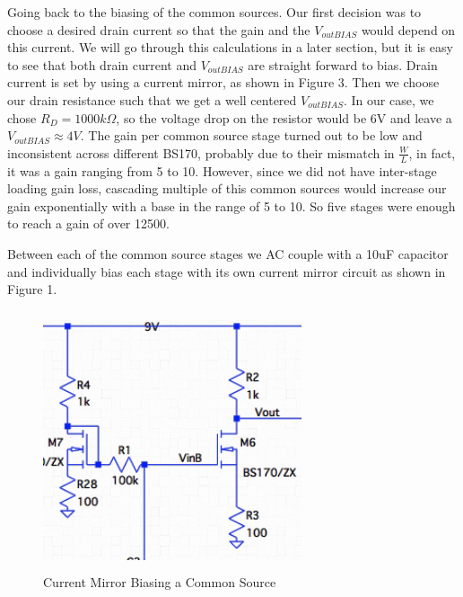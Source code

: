 \documentclass[11pt, twoside, letterpaper]{article}
\begin{document}
Going back to the biasing of the common sources. Our first decision was to choose a desired drain current so that the gain and the $V_{outBIAS}$
would depend on this current. We will go through this calculations in a later section, but it is easy to see that both drain current and 
$V_{outBIAS}$ are straight forward to bias. Drain current is set by using a current mirror, as shown in Figure 3. Then we choose our drain 
resistance such that we get a well centered $V_{outBIAS}$. In our case, we chose $R_D=1000k\Omega$, so the voltage drop on the resistor would be 
6V and leave a $V_{outBIAS}\approx 4V$. The gain per common source stage turned out to be low and inconsistent across different BS170, probably
due to their mismatch in $\frac{W}{L}$, in fact, it was a gain ranging from 5 to 10. However, since we did not have inter-stage loading gain loss,
cascading multiple of this common sources would increase our gain exponentially with a base in the range of 5 to 10. So five stages were enough
to reach a gain of over 12500.

Between each of the common source stages we AC couple with a 10uF capacitor and individually bias each stage with its own current mirror circuit
as shown in Figure 1.

\begin{figure}[htbp]
\begin{center}
\includegraphics[width=3in,height=3in]{CurrentMirror.png}
\caption{Current Mirror Biasing a Common Source}
\end{center}
\end{figure}
\FloatBarrier
\end{document}

